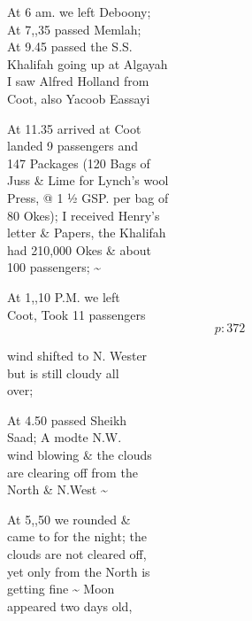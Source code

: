 \documentclass{report}
\begin{document}
	\par{
 	At 6 am. we left Deboony;\ \\At 7,,35 passed Memlah;\ \\At 9.45 passed the S.S.\ \\Khalifah going up at Algayah\ \\I saw Alfred Holland from\ \\Coot, also Yacoob Eassayi\ \\
	}

	\par{
 	At 11.35 arrived at Coot\ \\landed 9 passengers and\ \\147 Packages (120 Bags of\ \\Juss \& Lime for Lynch’s wool\ \\Press, @ 1 ½ GSP. per bag of\ \\80 Okes); I received Henry’s\ \\letter \& Papers, the Khalifah\ \\had 210,000 Okes \& about\ \\100 passengers; \~{}\ \\
	}

	\par{
 	At 1,,10 P.M. we left\ \\Coot, Took 11 passengers\ \\
  \[p: 372 \]

	}

	\par{
 	wind shifted to N. Wester\ \\but is still cloudy all\ \\over;\ \\
	}

	\par{
 	At 4.50 passed Sheikh\ \\Saad; A modte N.W.\ \\wind blowing \& the clouds\ \\are clearing off from the\ \\North \& N.West \~{}\ \\
	}

	\par{
 	At 5,,50 we rounded \&\ \\came to for the night; the\ \\clouds are not cleared off,\ \\yet only from the North is\ \\getting fine \~{} Moon\ \\appeared two days old,\ \\
	}
\end{document}
